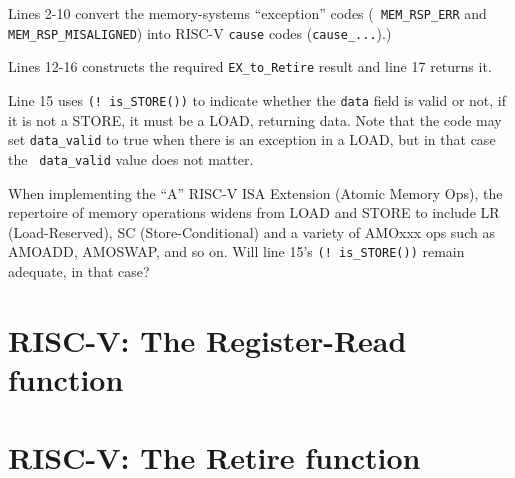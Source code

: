 Lines 2-10 convert the memory-systems ``exception'' codes ({\tt
MEM\_RSP\_ERR} and {\tt MEM\_RSP\_MISALIGNED}) into RISC-V {\tt cause}
codes ({\tt cause\_...}).)

Lines 12-16 constructs the required {\tt EX\_to\_Retire} result and
line 17 returns it.

Line 15 uses {\tt (!~is\_STORE())} to indicate whether the {\tt data}
field is valid or not, {\ie} if it is not a STORE, it must be a LOAD,
returning data.  Note that the code may set {\tt data\_valid} to true
when there is an exception in a LOAD, but in that case the {\tt
data\_valid} value does not matter.

\hdivider

\Exercise

When implementing the ``A'' RISC-V ISA Extension (Atomic Memory Ops),
the repertoire of memory operations widens from LOAD and STORE to
include LR (Load-Reserved), SC (Store-Conditional) and a variety of
AMOxxx ops such as AMOADD, AMOSWAP, and so on.
Will line 15's {\tt (!~is\_STORE())} remain adequate, in that case?

\Endexercise


\section{RISC-V: The Register-Read function}

\label{Sec_fn_RR}



\section{RISC-V: The Retire function}

\label{Sec_fn_Retire}


